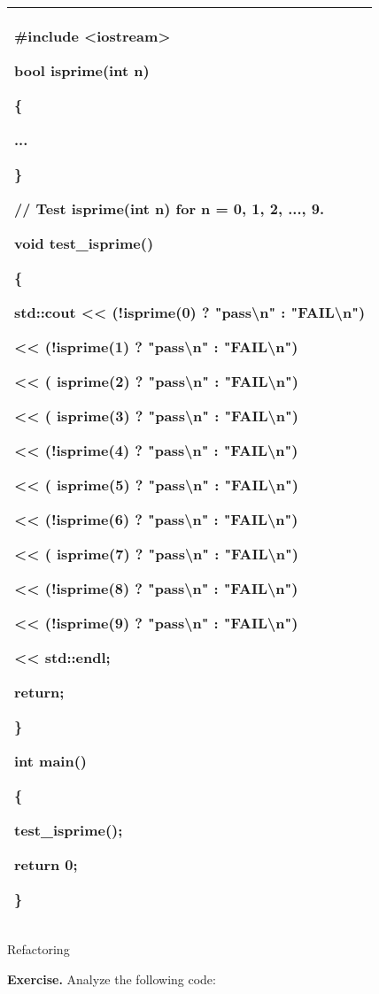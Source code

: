 \documentclass[
]{article}
\begin{document}
\begin{longtable}[]{@{}l@{}}
\toprule
\endhead
\begin{minipage}[t]{0.97\columnwidth}\raggedright
\#include \textless iostream\textgreater{}

bool isprime(int n)

\{

...

\}

// Test isprime(int n) for n = 0, 1, 2, ..., 9.

void test\_isprime()

\{

std::cout \textless\textless{} (!isprime(0) ? "pass\textbackslash n" :
"FAIL\textbackslash n")

\textless\textless{} (!isprime(1) ? "pass\textbackslash n" :
"FAIL\textbackslash n")

\textless\textless{} ( isprime(2) ? "pass\textbackslash n" :
"FAIL\textbackslash n")

\textless\textless{} ( isprime(3) ? "pass\textbackslash n" :
"FAIL\textbackslash n")

\textless\textless{} (!isprime(4) ? "pass\textbackslash n" :
"FAIL\textbackslash n")

\textless\textless{} ( isprime(5) ? "pass\textbackslash n" :
"FAIL\textbackslash n")

\textless\textless{} (!isprime(6) ? "pass\textbackslash n" :
"FAIL\textbackslash n")

\textless\textless{} ( isprime(7) ? "pass\textbackslash n" :
"FAIL\textbackslash n")

\textless\textless{} (!isprime(8) ? "pass\textbackslash n" :
"FAIL\textbackslash n")

\textless\textless{} (!isprime(9) ? "pass\textbackslash n" :
"FAIL\textbackslash n")

\textless\textless{} std::endl;

return;

\}

int main()

\{

test\_isprime();

return 0;

\}\strut
\end{minipage}\tabularnewline
\bottomrule
\end{longtable}

Refactoring

\textbf{Exercise.} Analyze the following code:
\end{document}
